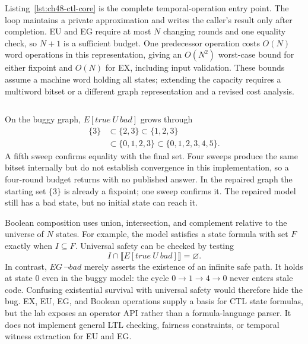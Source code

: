 Listing~\ref{lst:ch48-ctl-core} is the complete temporal-operation entry point.
The loop maintains a private approximation and writes the caller's result only after completion.
EU and EG require at most $N$ changing rounds and one equality check, so $N+1$ is a sufficient budget.
One predecessor operation costs $O(N)$ word operations in this representation, giving an $O(N^2)$ worst-case bound for either fixpoint and $O(N)$ for EX, including input validation.
These bounds assume a machine word holding all states; extending the capacity requires a multiword bitset or a different graph representation and a revised cost analysis.

\begin{listing}[htbp]
  \inputminted[firstline=146,lastline=168]{c}{example-code/model-checker/checker.c}
  \caption{One entry point implements EX and the ascending EU and descending EG iterations.}
  \label{lst:ch48-ctl-core}
\end{listing}

On the buggy graph, $E[\mathit{true}\ U\ \mathit{bad}]$ grows through
\[
\begin{split}
  \{3\}&\subset\{2,3\}\subset\{1,2,3\}\\
         &\subset\{0,1,2,3\}\subset\{0,1,2,3,4,5\}.
\end{split}
\]
A fifth sweep confirms equality with the final set.
Four sweeps produce the same bitset internally but do not establish convergence in this implementation, so a four-round budget returns  with no published answer.
In the repaired graph the starting set $\{3\}$ is already a fixpoint; one sweep confirms it.
The repaired model still has a bad state, but no initial state can reach it.

Boolean composition uses union, intersection, and complement relative to the universe of $N$ states.
For example, the model satisfies a state formula with set $F$ exactly when $I\subseteq F$.
Universal safety can be checked by testing
\[
  I\cap\llbracket E[\mathit{true}\ U\ \mathit{bad}]\rrbracket=\varnothing.
\]
In contrast, $EG\,\neg\mathit{bad}$ merely asserts the existence of an infinite safe path.
It holds at state 0 even in the buggy model: the cycle $0\to1\to4\to0$ never enters stale code.
Confusing existential survival with universal safety would therefore hide the bug.
EX, EU, EG, and Boolean operations supply a basis for CTL state formulas, but the lab exposes an operator API rather than a formula-language parser.
It does not implement general LTL checking, fairness constraints, or temporal witness extraction for EU and EG.

